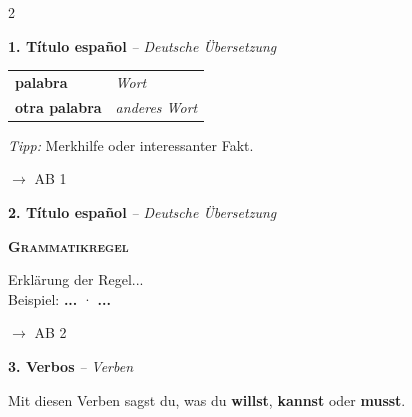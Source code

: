 \documentclass[11pt, a4paper]{article}
\newcommand{\seriftext}[1]{{\fontfamily{ppl}\selectfont #1}}
\newcommand{\es}[1]{\seriftext{\textbf{#1}}}
\newcommand{\de}[1]{\textit{\textcolor{akzent}{#1}}}
\newcommand{\gram}[1]{\textsc{#1}}
\newcommand{\abmark}[1]{{\footnotesize\textcolor{akzent}{$\rightarrow$ AB #1}}}
\newcommand{\abschnitt}[2]{\noindent\textbf{\large #1. #2}}
\begin{document}
\begin{multicols}{2}

\abschnitt{1}{Título español} \de{-- Deutsche Übersetzung}

\vspace{4pt}

\begin{tabular}{@{}ll@{}}
\es{palabra} & \de{Wort} \\[0.4em]
\es{otra palabra} & \de{anderes Wort} \\[0.4em]
\end{tabular}

\vspace{4pt}

\begin{tippbox}
\footnotesize\textit{Tipp:} Merkhilfe oder interessanter Fakt.
\end{tippbox}

\abmark{1}

\vspace{8pt}

\abschnitt{2}{Título español} \de{-- Deutsche Übersetzung}

\vspace{4pt}

\begin{grammatikbox}
\textbf{\gram{Grammatikregel}}

Erklärung der Regel...\\
{\small Beispiel: \es{...} · \es{...}}
\end{grammatikbox}

\abmark{2}

\columnbreak

\abschnitt{3}{Verbos} \de{-- Verben}

\vspace{4pt}

Mit diesen Verben sagst du, was du \textbf{willst}, \textbf{kannst} oder \textbf{musst}.


\end{multicols}
\end{document}
